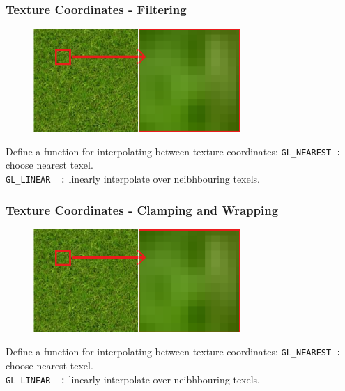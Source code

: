 \documentclass{beamer}
\begin{document}
%
%
%
\begin{frame}
\frametitle{Texture Coordinates - Filtering}
\begin{figure}
\includegraphics[width=0.7\textwidth]{images/filtering.png}
\end{figure}
Define a function for interpolating between texture coordinates:
\texttt{GL\_NEAREST :} choose nearest texel.\\
\texttt{GL\_LINEAR\ \  :} linearly interpolate over neibhbouring texels.
\end{frame}


%
%
%
\begin{frame}
\frametitle{Texture Coordinates - Clamping and Wrapping}
\begin{figure}
\includegraphics[width=0.7\textwidth]{images/filtering.png}
\end{figure}
Define a function for interpolating between texture coordinates:
\texttt{GL\_NEAREST :} choose nearest texel.\\
\texttt{GL\_LINEAR\ \  :} linearly interpolate over neibhbouring texels.
\end{frame}


%
%
%
\end{document}

